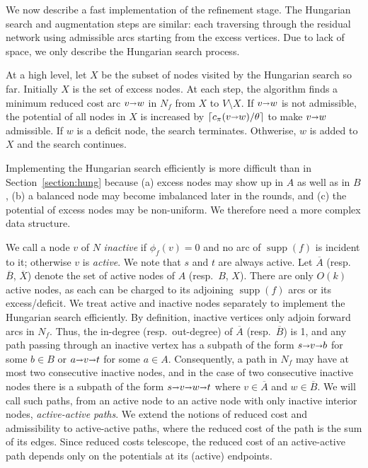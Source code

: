 \documentclass[a4paper,UKenglish]{socg-lipics-v2018}
\def\Ceil#1{\left\lceil #1 \right\rceil}
\def\fsupply{\phi}
\def\arcto{\mathord\shortrightarrow}
\def\arc#1#2{#1\arcto#2}
\def\supp{\operatorname{supp}}
\theoremstyle{plain}
\numberwithin{figure}{section}
\def\EMPH#1{\textcolor{BrickRed}{{\emph{#1}}}}
\begin{document}
We now describe a fast implementation of the refinement stage.
The Hungarian search and augmentation steps are similar:
each traversing through the residual network using admissible arcs starting
from the excess vertices.
Due to lack of space, we only describe the Hungarian search process.

At a high level, let $X$ be the subset of nodes visited by the Hungarian search
so far.
Initially $X$ is the set of excess nodes.
At each step, the algorithm finds a minimum reduced cost arc $\arc vw$ in $N_f$
from $X$ to $V \setminus X$.
If $\arc vw$ is not admissible, the potential of all nodes in $X$ is increased
by $\Ceil{c_\pi(\arc vw)/\theta}$ to make $\arc vw$ admissible.
If $w $ is a deficit node, the search terminates.
Othwerise, $w$ is added to $X$ and the search continues.

Implementing the Hungarian search efficiently is more difficult than in
Section~\ref{section:hung} because (a) excess nodes may show up in $A$ as well as in $B$,
(b) a balanced node may become imbalanced later in the rounds,
and (c) the potential of excess nodes may be non-uniform.
We therefore need a more complex data structure.

We call a node $v$ of $N$ \EMPH{inactive} if $\fsupply_f(v) = 0$ and no arc of
$\supp(f)$ is incident to it; otherwise $v$ is \EMPH{active}.
We note that $s$ and $t$ are always active.
Let $\overline{A}$ (resp.\ $\overline{B}$, $\overline{X}$) denote the set of
active nodes of $A$ (resp.\ $B$, $X$).
There are only $O(k)$ active nodes, as each can be charged to its
adjoining $\supp(f)$ arcs or its excess/deficit.
We treat active and inactive nodes separately to implement the Hungarian search
efficiently.
By definition, inactive vertices only adjoin forward arcs in $N_f$.
Thus, the in-degree (resp.\ out-degree) of $\overline{A}$ (resp.\ $\overline{B}$)
is 1, and any path passing through an inactive vertex has a subpath of the form
$s \arcto v \arcto b$ for some $b \in B$ or $a \arcto v \arcto t$ for some $a \in A$.
Consequently, a path in $N_f$ may have at most two consecutive inactive nodes,
and in the case of two consecutive inactive nodes there is a subpath of the
form $s \arcto v \arcto w \arcto t$ where $v \in \overline{A}$ and $w \in \overline{B}$.
We will call such paths, from an active node to an active node
with only inactive interior nodes, \EMPH{active-active paths}.
We extend the notions of reduced cost and admissibility to active-active paths,
where the reduced cost of the path is the sum of its edges.
Since reduced costs telescope, the reduced cost of an active-active path
depends only on the potentials at its (active) endpoints.
\end{document}
